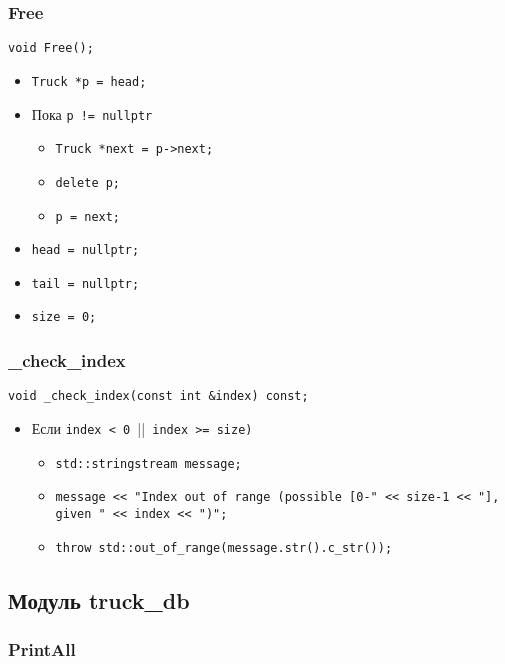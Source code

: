 \subsubsection*{Free}

\begin{lstlisting}
void Free();
\end{lstlisting}

\begin{itemize}
	\item \verb|Truck *p = head;|
	\item Пока \verb|p != nullptr|
	\begin{itemize}
		\item \verb|Truck *next = p->next;|
		\item \verb|delete p;|
		\item \verb|p = next;|
	\end{itemize}
	\item \verb|head = nullptr;|
	\item \verb|tail = nullptr;|
	\item \verb|size = 0;|
\end{itemize}


\subsubsection*{\_check\_index}

\begin{lstlisting}
void _check_index(const int &index) const;
\end{lstlisting}

\begin{itemize}
	\item Если \verb|index < 0 |||\verb| index >= size)|
	\begin{itemize}
		\item \verb|std::stringstream message;|
		\item \verb|message << "Index out of range (possible [0-" << size-1 << "], given " << index << ")";|
		\item \verb|throw std::out_of_range(message.str().c_str());|
	\end{itemize}
\end{itemize}


\subsection*{Модуль truck\_db}


\subsubsection*{PrintAll}

